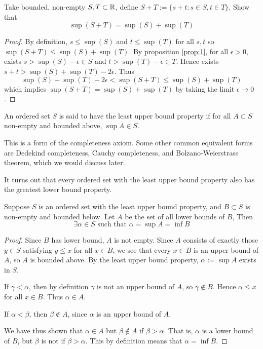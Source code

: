 \documentclass[11pt]{article}
\begin{document}
\begin{exercise}
  Take bounded, non-empty \(S,T\subset\mathbb{R}\), define \(S+T:=\{s+t:s\in S,t\in T\}\). Show that
  \[\sup(S+T)=\sup(S)+\sup(T)\]
\end{exercise}
\begin{proof}
  By definition, \(s\leq \sup(S)\) and \(t\leq \sup(T)\) for all \(s,t\) so \(\sup(S+T)\leq \sup(S)+\sup(T)\). By proposition \ref{prop:1}, for all \(\epsilon>0\), exists \(s>\sup(S)-\epsilon \in S\) and \(t>\sup(T)-\epsilon\in T\). Hence exists \(s+t > \sup(S)+\sup(T)-2\epsilon\). Thus
  \[\sup(S)+\sup(T)-2\epsilon<\sup(S+T)\leq\sup(S)+\sup(T)\]
  which implies \(\sup(S+T)=\sup(S)+\sup(T)\) by taking the limit \(\epsilon\to 0\).
\end{proof}


\begin{definition}
  An ordered set \(S\) is said to have the least upper bound property if for all \(A\subset S\) non-empty and bounded above, \(\sup A\in S\).
\end{definition}
This is a form of the completeness axiom. Some other common equivalent forms are Dedekind completeness, Cauchy completeness, and Bolzano-Weierstrass theorem, which we would discuss later.

It turns out that every ordered set with the least upper bound property also has the greatest lower bound property.
\begin{theorem}
  Suppose \(S\) is an ordered set with the least upper bound property, and \(B \subset S\) is non-empty and bounded below. Let \(A\) be the set of all lower bounds of \(B\), Then \[\exists \alpha \in S \text{ such that } \alpha = \sup A = \inf B\] 
\end{theorem}
\begin{proof}
  Since \(B\) has lower bound, \(A\) is not empty. Since \(A\) consists of exactly those \(y\in S\) satisfying \(y\leq x\) for all \(x\in B\), we see that every \(x\in B\) is an upper bound of \(A\), so \(A\) is bounded above. By the least upper bound property, \(\alpha:=\sup A\) exists in \(S\).

  If \(\gamma<\alpha\), then by definition \(\gamma\) is not an upper bound of \(A\), so \(\gamma \notin B\). Hence \(\alpha \leq x\) for all \(x\in B\). Thus \(\alpha \in A\).

  If \(\alpha < \beta\), then \(\beta \notin A\), since \(\alpha\) is an upper bound of \(A\).

  We have thus shown that \(\alpha \in A\) but \(\beta \notin A\) if \(\beta > \alpha\). That is, \(\alpha\) is a lower bound of \(B\), but \(\beta\) is not if \(\beta > \alpha\). This by definition means that \(\alpha = \inf B\).
\end{proof}
\end{document}
